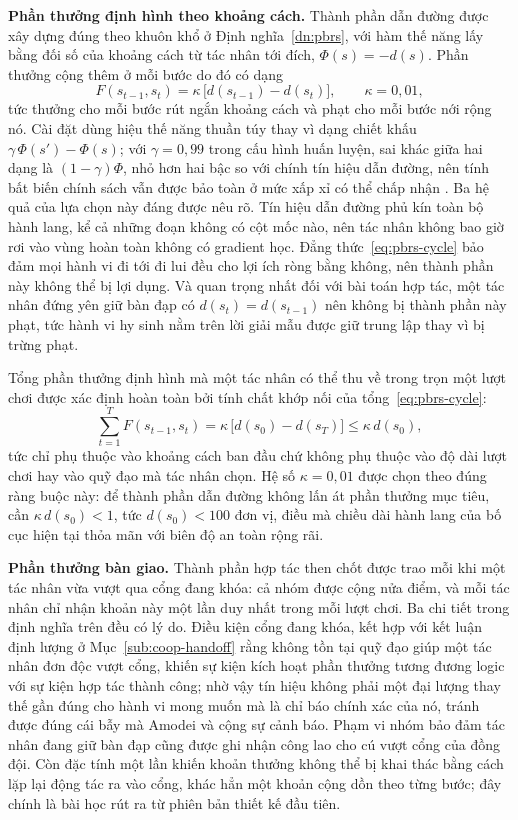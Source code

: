 \indent \textbf{Phần thưởng định hình theo khoảng cách.} Thành phần dẫn đường được xây
dựng đúng theo khuôn khổ ở Định nghĩa~\ref{dn:pbrs}, với hàm thế năng lấy bằng đối số
của khoảng cách từ tác nhân tới đích, $\Phi(s) = -d(s)$. Phần thưởng cộng thêm ở mỗi
bước do đó có dạng
\begin{equation}
F(s_{t-1}, s_t) = \kappa\,\bigl[d(s_{t-1}) - d(s_t)\bigr], \qquad \kappa = 0{,}01 ,
\label{eq:ctf-pbrs}
\end{equation}
tức thưởng cho mỗi bước rút ngắn khoảng cách và phạt cho mỗi bước nới rộng nó. Cài đặt
dùng hiệu thế năng thuần túy thay vì dạng chiết khấu $\gamma\,\Phi(s') - \Phi(s)$; với
$\gamma = 0{,}99$ trong cấu hình huấn luyện, sai khác giữa hai dạng là $(1-\gamma)\Phi$,
nhỏ hơn hai bậc so với chính tín hiệu dẫn đường, nên tính bất biến chính sách vẫn được
bảo toàn ở mức xấp xỉ có thể chấp nhận \cite{devlin2012dynamic}. Ba hệ quả của lựa chọn
này đáng được nêu rõ. Tín hiệu dẫn đường phủ kín toàn bộ hành lang, kể cả những đoạn
không có cột mốc nào, nên tác nhân không bao giờ rơi vào vùng hoàn toàn không có gradient
học. Đẳng thức~\eqref{eq:pbrs-cycle} bảo đảm mọi hành vi đi tới đi lui đều cho lợi ích
ròng bằng không, nên thành phần này không thể bị lợi dụng. Và quan trọng nhất đối với
bài toán hợp tác, một tác nhân đứng yên giữ bàn đạp có $d(s_t) = d(s_{t-1})$ nên
không bị thành phần này phạt, tức hành vi hy sinh nằm trên lời giải mẫu được giữ trung
lập thay vì bị trừng phạt.

\indent Tổng phần thưởng định hình mà một tác nhân có thể thu về trong trọn một lượt
chơi được xác định hoàn toàn bởi tính chất khớp nối của tổng~\eqref{eq:pbrs-cycle}:
\begin{equation}
\sum_{t=1}^{T} F(s_{t-1}, s_t)
= \kappa\,\bigl[d(s_0) - d(s_T)\bigr] \le \kappa\, d(s_0) ,
\label{eq:ctf-shaping-bound}
\end{equation}
tức chỉ phụ thuộc vào khoảng cách ban đầu chứ không phụ thuộc vào độ dài lượt chơi hay
vào quỹ đạo mà tác nhân chọn. Hệ số $\kappa = 0{,}01$ được chọn theo đúng ràng buộc
này: để thành phần dẫn đường không lấn át phần thưởng mục tiêu, cần $\kappa\,d(s_0) < 1$,
tức $d(s_0) < 100$ đơn vị, điều mà chiều dài hành lang của bố cục hiện tại thỏa mãn với
biên độ an toàn rộng rãi.

\indent \textbf{Phần thưởng bàn giao.} Thành phần hợp tác then chốt được trao mỗi khi
một tác nhân vừa vượt qua cổng đang khóa: cả nhóm được cộng nửa điểm, và mỗi tác
nhân chỉ nhận khoản này một lần duy nhất trong mỗi lượt chơi. Ba chi tiết trong định
nghĩa trên đều có lý do. Điều kiện cổng đang khóa, kết hợp với kết luận định lượng ở
Mục~\ref{sub:coop-handoff} rằng không tồn tại quỹ đạo giúp một tác nhân đơn độc vượt
cổng, khiến sự kiện kích hoạt phần thưởng tương đương logic với sự kiện hợp tác
thành công; nhờ vậy tín hiệu không phải một đại lượng thay thế gần đúng cho hành vi mong
muốn mà là chỉ báo chính xác của nó, tránh được đúng cái bẫy mà Amodei và cộng sự
\cite{amodei2016concrete} cảnh báo. Phạm vi nhóm bảo đảm tác nhân đang giữ bàn đạp cũng
được ghi nhận công lao cho cú vượt cổng của đồng đội. Còn đặc tính một lần khiến khoản
thưởng không thể bị khai thác bằng cách lặp lại động tác ra vào cổng, khác hẳn một khoản
cộng dồn theo từng bước; đây chính là bài học rút ra từ phiên bản thiết kế đầu tiên.

